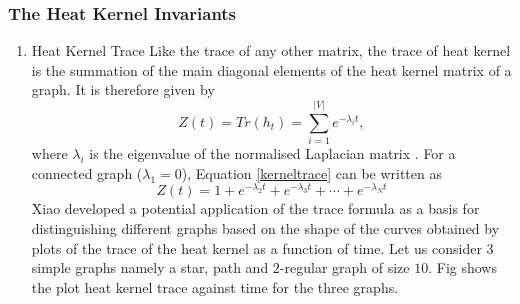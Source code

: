 \documentclass[10pt,a4paper]{article}
\begin{document}
        \subsubsection{The Heat Kernel Invariants}
        \begin{enumerate}[1]
        	\item Heat Kernel Trace
        	Like the trace of any other matrix, the trace of heat kernel is the summation of the main diagonal elements of the heat kernel matrix of a graph. It is therefore given by
        	\begin{equation}
        	Z(t) = Tr(h_t) = \sum_{i=1}^{|V|} e^{-\lambda_i t},
        	\label{kerneltrace}
        	\end{equation}
        	where $\lambda_i$ is the eigenvalue of the normalised Laplacian matrix \cite{xiao2009graph}. 
        	For a connected graph ($\lambda_1 = 0$), Equation \ref{kerneltrace} can be written as 
        	\begin{equation}
        	Z(t) =  1+ e^{-\lambda_2 t} + e^{-\lambda_3t} + \cdots + e^{-\lambda_N t}
        	\end{equation}
        	Xiao \cite{xiao2009graph} developed a potential application of the trace formula as a basis for distinguishing different graphs based on the shape of the curves obtained by plots of the trace of the heat kernel as a function of time. Let us consider $3$ simple graphs namely a star, path and $2$-regular graph of size $10$. Fig shows the plot heat kernel trace against time for the three graphs.
        	

\end{enumerate}
\end{document}
